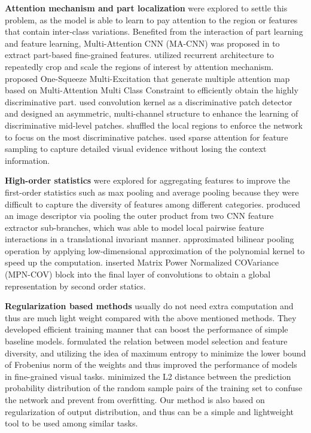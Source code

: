 \documentclass{article}
\theoremstyle{definition}
\begin{document}
\textbf{Attention mechanism and part localization} were explored to settle this problem, as the model is able to learn to pay attention to the region or features that contain inter-class variations. Benefited from the interaction of part learning and feature learning, Multi-Attention CNN (MA-CNN) was proposed in \cite{zheng2017learning} to extract part-based fine-grained features. 
\cite{fu2017look} utilized recurrent architecture to repeatedly crop and scale the regions of interest by attention mechanism.
\cite{sun2018multi} proposed One-Squeeze Multi-Excitation that generate multiple attention map based on Multi-Attention Multi Class Constraint to efficiently obtain the highly discriminative part.
\cite{wang2018learning} used  convolution kernel as a discriminative patch detector and designed an asymmetric, multi-channel structure to enhance the learning of discriminative mid-level patches.
\cite{chen2019destruction} shuffled the local regions to enforce the network to focus on the most discriminative patches.
\cite{ding2019selective} used sparse attention for feature sampling to capture detailed visual evidence without losing the context information.


\textbf{High-order statistics} were explored for aggregating features to improve the first-order statistics such as max pooling and average pooling because they were difficult to capture the diversity of features among different categories.
\cite{lin2015bilinear} produced an image descriptor via pooling the outer product from two CNN feature extractor sub-branches, which was able to model local pairwise feature interactions in a translational invariant manner.
\cite{gao2016compact} approximated bilinear pooling operation by applying low-dimensional approximation of the polynomial kernel to speed up the computation.
\cite{wang2019deep} inserted Matrix Power Normalized COVariance (MPN-COV) block into the final layer of convolutions to obtain a global representation by second order statics. 

\textbf{Regularization based methods} usually do not need extra computation and thus are much light weight compared with the above mentioned methods. They developed efficient training manner that can boost the performance of simple baseline models. \cite{dubey2018maximum} formulated the relation between model selection and feature diversity, and utilizing the idea of maximum entropy to minimize the lower bound of Frobenius norm of the weights and thus improved the performance of models in fine-grained visual tasks. \cite{dubey2018pairwise} minimized the L2 distance between the prediction probability distribution of the random sample pairs of the training set to confuse the network and prevent from overfitting. Our method is also based on regularization of output distribution, and thus can be a simple and lightweight tool to be used among similar tasks.
\end{document}
